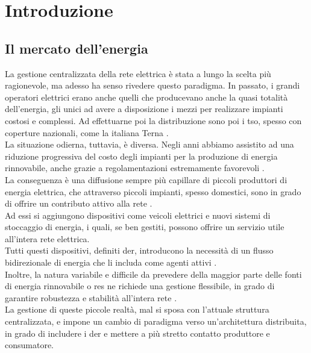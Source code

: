 \chapter{Introduzione}

\section{Il mercato dell'energia}
La gestione centralizzata della rete elettrica è stata a lungo la scelta più ragionevole, ma adesso ha senso rivedere questo paradigma.
In passato, i grandi operatori elettrici erano anche quelli che producevano anche la quasi totalità dell'energia, gli unici ad avere a disposizione i mezzi per realizzare impianti costosi e complessi.
Ad effettuarne poi la distribuzione sono poi i \gls{tso}, spesso con coperture nazionali, come la italiana Terna \cite{art:terna-role}. \\
La situazione odierna, tuttavia, è diversa.
Negli anni abbiamo assistito ad una riduzione progressiva del costo degli impianti per la produzione di energia rinnovabile,
anche grazie a regolamentazioni estremamente favorevoli \cite{art:renewable-energy-regulations}. \\
La conseguenza è una diffusione sempre più capillare di piccoli produttori di energia elettrica,
che attraverso piccoli impianti, spesso domestici, sono in grado di offrire un contributo attivo alla rete \cite{art:renewable-energy-increment}. \\
Ad essi si aggiungono dispositivi come veicoli elettrici e nuovi sistemi di stoccaggio di energia, i quali, se ben gestiti,
possono offrire un servizio utile all'intera rete elettrica. \\
Tutti questi dispositivi, definiti \gls{der}, introducono la necessità di un flusso bidirezionale di energia che li includa come agenti attivi \cite{art:enel-der}. \\
Inoltre, la natura variabile e difficile da prevedere della maggior parte delle fonti di energia rinnovabile o \gls{res} ne richiede una gestione flessibile,
in grado di garantire robustezza e stabilità all'intera rete \cite{art:blockchain-der}. \\

La gestione di queste piccole realtà, mal si sposa con l'attuale struttura centralizzata, e impone un cambio di paradigma verso un'architettura distribuita,
in grado di includere i \gls{der} e mettere a più stretto contatto produttore e consumatore.

